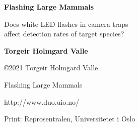 \begin{center}
\thispagestyle{plain}
	\vspace{0.4cm}
	\Large
	\textbf{Flashing Large Mammals}
	
	\large
	Does white LED flashes in camera traps \\
	affect detection rates of target species?
	
	\textbf{Torgeir Holmgard Valle}
	
\end{center}

\clearpage

\begin{flushleft}
	
\thispagestyle{plain}
\vspace*{20cm}

\copyright 2021 Torgeir Holmgard Valle

Flashing Large Mammals

http://www.duo.uio.no/

Print: Reprosentralen, Universitetet i Oslo

\end{flushleft}